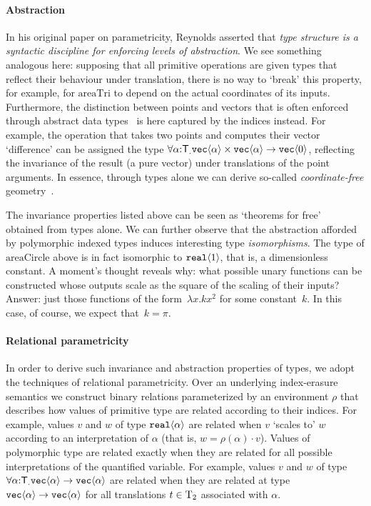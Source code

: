 \paragraph{Abstraction}
In his original paper on parametricity, Reynolds asserted that \emph{type structure is
  a syntactic discipline for enforcing levels of abstraction}.  We see
something analogous here: supposing that all primitive operations are
given types that reflect their behaviour under translation, there is
no way to `break' this property, for example, for $\mathrm{areaTri}$
to depend on the actual coordinates of its inputs. Furthermore, the
distinction between points and vectors that is often enforced through
abstract data types~\cite{CGAL} is here captured by the indices
instead. For example, the operation that takes two points and computes
their vector `difference' can be assigned the type
$\forall\alpha\mathord:\mathsf{T}_.\textup{\texttt{vec}}\langle \alpha \rangle\times\textup{\texttt{vec}}\langle \alpha \rangle\to\textup{\texttt{vec}}\langle 0 \rangle$,
reflecting the invariance of the result (a pure vector) under
translations of the point arguments. In essence, through types alone
we can derive so-called \emph{coordinate-free} geometry~\cite{CFGADT}.

The invariance properties listed above can be seen as `theorems for
free'~\cite{wadler89theorems} obtained from types alone. We can
further observe that the abstraction afforded by polymorphic indexed
types induces interesting type \emph{isomorphisms}.  The type of
$\mathrm{areaCircle}$ above is in fact isomorphic to
$\textup{\texttt{real}}\langle 1 \rangle$, that is, a dimensionless constant. A moment's
thought reveals why: what possible unary functions can be constructed whose
outputs scale as the square of the scaling of their inputs? Answer:
just those functions of the form~$\lambda x. k x^2$ for some constant~$k$.
In this case, of course, we expect that~$k = \pi$.

\paragraph{Relational parametricity}
In order to derive such invariance and abstraction properties of types, we
adopt the techniques of relational parametricity. Over an underlying index-erasure semantics
we construct binary
relations parameterized by an environment $\rho$ that describes how values of primitive type
are related according to their indices. 
For example, values $v$ and
$w$ of type $\textup{\texttt{real}}\langle \alpha \rangle$ are related when $v$ `scales to' $w$
according to an interpretation of $\alpha$ (that is, $w=\rho(\alpha)\cdot v$).
Values of polymorphic type are related exactly when they are related for
all possible interpretations of the quantified variable. For example, 
values $v$ and $w$ of type $\forall\alpha\mathord:\mathsf{T}_.\textup{\texttt{vec}}\langle \alpha \rangle\to
\textup{\texttt{vec}}\langle \alpha \rangle$ are related when they are related at type 
$\textup{\texttt{vec}}\langle \alpha \rangle\to\textup{\texttt{vec}}\langle \alpha \rangle$ for all 
translations $t\in\mathrm{T}_2$ associated with $\alpha$. 

